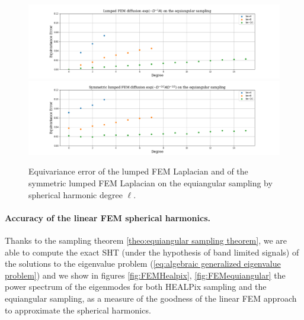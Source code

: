 \begin{figure}[h!]
	\centering
	\includegraphics[width=\textwidth]{../codes/06.Equivariance_error/LumpedFEMLaplacianonequiangularsampling.png}
	\includegraphics[width=\textwidth]{../codes/06.Equivariance_error/SymmetriclumpedFEMLaplacianonequiangularsampling.png}
	\caption{\label{fig:Equivariance error of the lumped FEM Laplacian}Equivariance error of the lumped FEM Laplacian and of the symmetric lumped FEM Laplacian on the equiangular sampling by spherical harmonic degree $\ell$.}
\end{figure}
\clearpage
\paragraph{Accuracy of the linear FEM spherical harmonics.} Thanks to the sampling theorem \ref{theo:equiangular sampling theorem}, we are able to compute the exact SHT (under the hypothesis of band limited signals) of the solutions to the eigenvalue problem (\ref{eq:algebraic generalized eigenvalue problem}) and we show in figures \ref{fig:FEMHealpix}, \ref{fig:FEMequiangular} the power spectrum of the eigenmodes for both HEALPix sampling and the equiangular sampling, as a measure of the goodness of the linear FEM approach to approximate the spherical harmonics.

